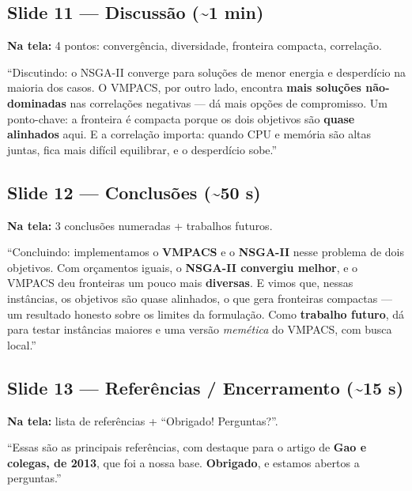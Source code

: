 \documentclass[11pt]{article}
\newcommand{\tela}[1]{\noindent\textcolor{tela}{\textbf{Na tela:} #1}\par\vspace{2pt}}
\newcommand{\tempo}[1]{\hfill\textcolor{cinza}{\small(\textasciitilde #1)}}
\begin{document}
\subsection{Slide 11 --- Discussão \tempo{1 min}}
\tela{4 pontos: convergência, diversidade, fronteira compacta, correlação.}
\begin{fala}
``Discutindo: o NSGA-II converge para soluções de menor energia e desperdício na
maioria dos casos. O VMPACS, por outro lado, encontra \textbf{mais soluções
não-dominadas} nas correlações negativas --- dá mais opções de compromisso. Um
ponto-chave: a fronteira é compacta porque os dois objetivos são \textbf{quase
alinhados} aqui. E a correlação importa: quando CPU e memória são altas juntas,
fica mais difícil equilibrar, e o desperdício sobe.''
\end{fala}

\subsection{Slide 12 --- Conclusões \tempo{50 s}}
\tela{3 conclusões numeradas + trabalhos futuros.}
\begin{fala}
``Concluindo: implementamos o \textbf{VMPACS} e o \textbf{NSGA-II} nesse problema
de dois objetivos. Com orçamentos iguais, o \textbf{NSGA-II convergiu melhor}, e o
VMPACS deu fronteiras um pouco mais \textbf{diversas}. E vimos que, nessas
instâncias, os objetivos são quase alinhados, o que gera fronteiras compactas ---
um resultado honesto sobre os limites da formulação. Como \textbf{trabalho
futuro}, dá para testar instâncias maiores e uma versão \emph{memética} do
VMPACS, com busca local.''
\end{fala}

\subsection{Slide 13 --- Referências / Encerramento \tempo{15 s}}
\tela{lista de referências + ``Obrigado! Perguntas?''.}
\begin{fala}
``Essas são as principais referências, com destaque para o artigo de
\textbf{Gao e colegas, de 2013}, que foi a nossa base. \textbf{Obrigado}, e
estamos abertos a perguntas.''
\end{fala}

\end{document}
